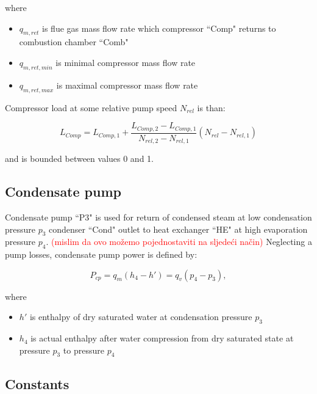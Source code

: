 \documentclass{article}
\begin{document}
	\noindent
	where
	
	\begin{itemize}
		\item $q_{m,ret}$ is flue gas mass flow rate which compressor “Comp" returns to combustion chamber “Comb"
		\item $q_{m,ret,min}$ is minimal compressor mass flow rate
		\item $q_{m,ret,max}$ is maximal compressor mass flow rate	
	\end{itemize}

	\noindent
	Compressor load at some relative pump speed $N_{rel}$ is than:
	
	\begin{equation}\label{eq:compressor_load_rel}
		L_{Comp} = L_{Comp,1} + \frac{L_{Comp,2} - L_{Comp,1}}{N_{rel,2} - N_{rel,1}} \left( N_{rel} - N_{rel,1}\right)
	\end{equation}
	
	\noindent
	and is bounded between values 0 and 1.
	
	\subsection*{Condensate pump}
	
	Condensate pump “P3" is used for return of condensed steam at low condensation pressure $p_3$ condenser “Cond" outlet to heat exchanger “HE" at high evaporation pressure $p_4$.
	\textcolor{red}{(mislim da ovo možemo pojednostaviti na sljedeći način)}
	Neglecting a pump losses, condensate pump power is defined by:

	\begin{equation}\label{eq:pump_loss}
		P_{cp} = q_m(h_4 - h') = q_v(p_4 - p_3), 
	\end{equation}

	\noindent
	where
	
	\begin{itemize}
		\item 	$h'$ is enthalpy of dry saturated water at condensation pressure $p_3$
		\item $h_4$ is actual enthalpy after water compression from dry saturated state at pressure $p_3$ to pressure $p_4$
	\end{itemize}

	\subsection{Constants}
	
\end{document}
